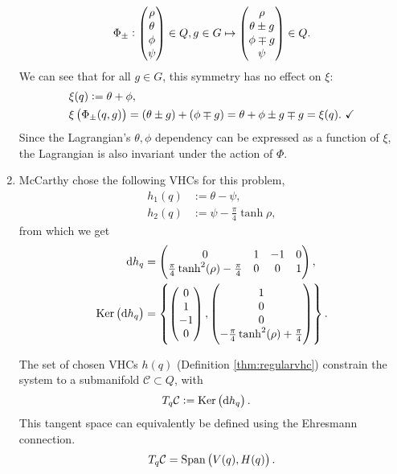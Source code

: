 \documentclass[main.tex]{subfiles}
\begin{document}
\begin{enumerate}[(1)]
    \begin{align}
        \Phi_\pm:\pmqty{\rho\\\theta\\\phi\\\psi}\in Q,g\in G\mapsto\pmqty{\rho\\\theta\pm g\\\phi\mp g\\\psi}\in Q.
    \end{align}
We can see that for all $g\in G$, this symmetry has no effect on $\xi$:
\begin{align}
    &\xi(q):=\theta+\phi,\\
    &\xi\del{\Phi_\pm(q,g)}=(\theta\pm g)+(\phi\mp g)=\theta+\phi \pm g \mp g=\xi(q).\ \checkmark
\end{align}
Since the Lagrangian's $\theta,\phi$ dependency can be expressed as a function of $\xi$, the Lagrangian is also invariant under the action of $\Phi$.



\item McCarthy chose the following VHCs for this problem,
\begin{align}
    h_1(q)&:=\theta-\psi,\\
    h_2(q)&:=\psi-\frac{\pi}{4}\tanh\rho,
\end{align}
from which we get
\begin{align}
    \dhq&=\pmqty{ 
    0 & 1 & -1 & 0\\
    \frac{\pi}{4}\tanh^2(\rho)-\frac{\pi}{4} & 0 & 0 & 1 },\\
    \Ker{\dhq}&=\cbr{
     \pmqty{ 0\\1\\-1\\0},\pmqty{ 1\\ 0\\ 0\\ -\frac{\pi}{4}\tanh^2(\rho)+\frac{\pi}{4} }}.\label{eq:kerdhqspeherical}
\end{align}

The set of chosen VHCs $h(q)$ (Definition \ref{thm:regularvhc}) constrain the system to a submanifold $\mathcal{C}\subset Q$, with
    \begin{align}
        T_q\mathcal{C}&:=\Ker{\dhq}.\label{eq:tangentspaceqcspherical}
    \end{align}
This tangent space can equivalently be defined using the Ehresmann connection. 
    \begin{align}
        T_q\mathcal{C}=\Span{V(q),H(q)}.
    \end{align}


\end{enumerate}
\end{document}
